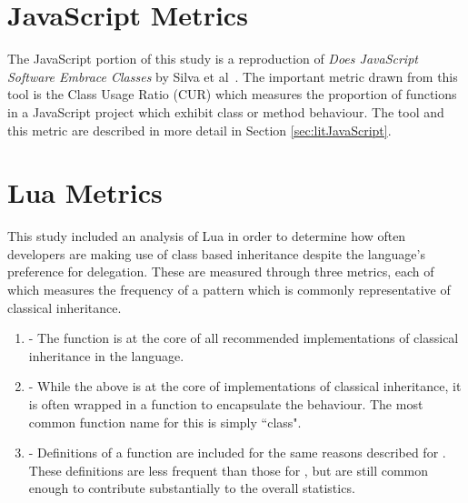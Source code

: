 \section{JavaScript Metrics}
The JavaScript portion of this study is a reproduction of \textit{Does JavaScript Software Embrace Classes} by Silva et al~\cite{JSClassFinder}. The important metric drawn from this tool is the Class Usage Ratio (CUR) which measures the proportion of functions in a JavaScript project which exhibit class or method behaviour. The tool and this metric are described in more detail in Section \ref{sec:litJavaScript}.

\section{Lua Metrics}
This study included an analysis of Lua in order to determine how often developers are making use of class based inheritance despite the language's preference for delegation. These are measured through three metrics, each of which measures the frequency of a pattern which is commonly representative of classical inheritance.
\begin{enumerate}
	\item {} - The  function is at the core of all recommended implementations of classical inheritance in the language.
	\item {} - While the  above is at the core of implementations of classical inheritance, it is often wrapped in a function to encapsulate the behaviour. The most common function name for this is simply ``class".
	\item {} - Definitions of a  function are included for the same reasons described for . These definitions are less frequent than those for , but are still common enough to contribute substantially to the overall statistics.
\end{enumerate}







